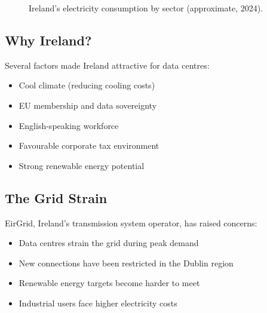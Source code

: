 \documentclass[11pt,a4paper]{article}
\begin{document}
\begin{figure}[H]
\centering
{}
\caption{Ireland's electricity consumption by sector (approximate, 2024).}
\end{figure}

\subsection{Why Ireland?}

Several factors made Ireland attractive for data centres:
\begin{itemize}
    \item Cool climate (reducing cooling costs)
    \item EU membership and data sovereignty
    \item English-speaking workforce
    \item Favourable corporate tax environment
    \item Strong renewable energy potential
\end{itemize}

\subsection{The Grid Strain}

EirGrid, Ireland's transmission system operator, has raised concerns:
\begin{itemize}
    \item Data centres strain the grid during peak demand
    \item New connections have been restricted in the Dublin region
    \item Renewable energy targets become harder to meet
    \item Industrial users face higher electricity costs
\end{itemize}
\end{document}
